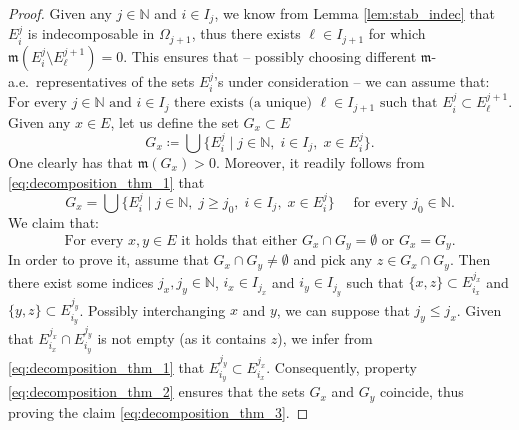 \documentclass[reqno]{amsart}
\numberwithin{equation}{section}
\newcommand{\N}{\mathbb{N}}
\newcommand{\mm}{\mathfrak m}
\newcommand{\1}{\mathbbm 1}
\begin{document}
\begin{proof}
Given any \(j\in\N\) and \(i\in I_j\), we know from Lemma \ref{lem:stab_indec}
that \(E^j_i\) is indecomposable in \(\Omega_{j+1}\), thus there exists
\(\ell\in I_{j+1}\) for which \(\mm(E^j_i\setminus E^{j+1}_\ell)=0\).
This ensures that -- possibly choosing different \(\mm\)-a.e.\ representatives
of the sets \(E^j_i\)'s under consideration -- we can assume that:
\begin{equation}\label{eq:decomposition_thm_1}
\text{For every }j\in\N\text{ and }i\in I_j\text{ there exists (a unique) }
\ell\in I_{j+1}\text{ such that }E^j_i\subset E^{j+1}_\ell.
\end{equation}
Given any \(x\in E\), let us define the set \(G_x\subset E\)
\[
G_x\coloneqq\bigcup\big\{E^j_i\;\big|\;j\in\N,\;i\in I_j,\;x\in E^j_i\big\}.
\]
One clearly has that \(\mm(G_x)>0\). Moreover, it readily follows
from \eqref{eq:decomposition_thm_1} that
\begin{equation}\label{eq:decomposition_thm_2}
G_x=\bigcup\big\{E^j_i\;\big|\;j\in\N,\;j\geq j_0,\;i\in I_j,\;x\in E^j_i\big\}
\quad\text{ for every }j_0\in\N.
\end{equation}
We claim that:
\begin{equation}\label{eq:decomposition_thm_3}
\text{For every }x,y\in E\text{ it holds that either }
G_x\cap G_y=\emptyset\text{ or }G_x=G_y.
\end{equation}
In order to prove it, assume that \(G_x\cap G_y\neq\emptyset\)
and pick any \(z\in G_x\cap G_y\). Then there exist some indices \(j_x,j_y\in\N\),
\(i_x\in I_{j_x}\) and \(i_y\in I_{j_y}\) such that \(\{x,z\}\subset E^{j_x}_{i_x}\)
and \(\{y,z\}\subset E^{j_y}_{i_y}\). Possibly interchanging \(x\) and \(y\),
we can suppose that \(j_y\leq j_x\). Given that \(E^{j_x}_{i_x}\cap E^{j_y}_{i_y}\)
is not empty (as it contains \(z\)), we infer from \eqref{eq:decomposition_thm_1}
that \(E^{j_y}_{i_y}\subset E^{j_x}_{i_x}\). Consequently, property
\eqref{eq:decomposition_thm_2} ensures that the sets \(G_x\) and \(G_y\)
coincide, thus proving the claim \eqref{eq:decomposition_thm_3}.


\end{proof}
\end{document}
